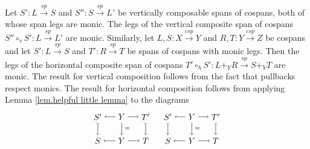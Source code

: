 \documentclass{tac}
\newcommand{\from}{\colon}
\renewcommand{\span}{\xrightarrow{\mathit{sp}}}
\newcommand{\cospan}{\xrightarrow{\mathit{csp}}}
\begin{document}
\lemma
	Let
		$ S' \from L \span S $
	and
		$ S'' \from S \span L' $
	be vertically composable spans of cospans,		
	both of whose span legs are monic.
	The legs of the vertical composite span of cospans
		$ S'' \circ_v S' \from L \span L' $
	are monic. Similarly, let 
		$ L , S \from X \cospan Y $ 
	and 
		$ R , T \from Y \cospan Z $ 
	be cospans and let 
		$ S ' \from L \span S $ 
	and 
		$ T ' \from R \span T $  
	be spans of cospans with monic legs.  
	Then the legs of the horizontal composite span of cospans
		$ T' \circ_h S' \from L +_Y R \span S +_Y T $
	are monic.
\endlemma
\proof
	The result for vertical composition 
	follows from the fact that pullbacks 
	respect monics. The result for horizontal 
	composition follows from applying Lemma 
		\ref{lem.helpful little lemma} to the 
	diagrams
	\[
		\begin{tikzpicture}
		\node (B) at (-1,1) {$S'$};
		\node (A) at (0,1) {$Y$};
		\node (C) at (1,1) {$T'$};
		\node (B') at (-1,0) {$S$};
		\node (A') at (0,0) {$Y$};
		\node (C') at (1,0) {$T$};
		\draw [->] (A) edge (B);
		\draw [font=\scriptsize,->] (A) edge node[right] {$=$} (A');
		\draw [->] (A) edge (C);
		\draw [->] (A') edge (B');
		\draw [->] (A') edge (C');
		\draw [>->] (B) edge (B');
		\draw [>->] (C) edge (C');
		\end{tikzpicture}
		\quad
		\begin{tikzpicture}
		\node (B) at (-1,1) {$S'$};
		\node (A) at (0,1) {$Y$};
		\node (C) at (1,1) {$T'$};
		\node (B') at (-1,0) {$S$};
		\node (A') at (0,0) {$Y$};
		\node (C') at (1,0) {$T$};
		\draw [->] (A) edge (B);
		\draw [font=\scriptsize,->] (A) edge node[right] {$=$} (A');
		\draw [->] (A) edge (C);
		\draw [->] (A') edge (B');
		\draw [->] (A') edge (C');
		\draw [>->] (B) edge (B');
		\draw [>->] (C) edge (C');
		\end{tikzpicture}
	\]
\endproof
\end{document}
